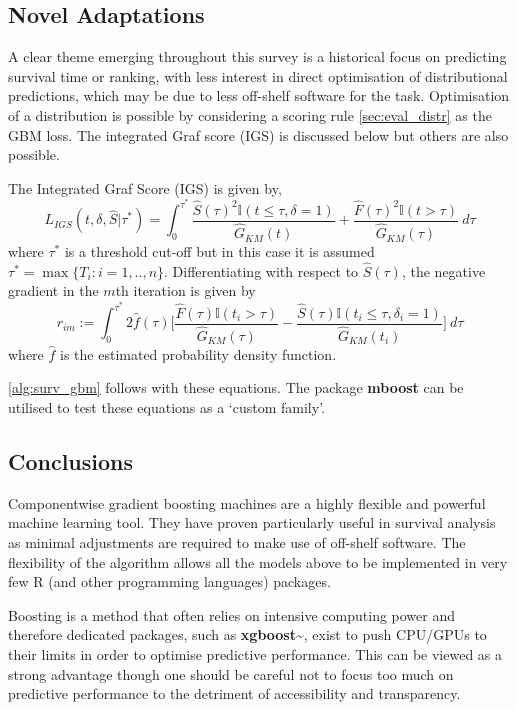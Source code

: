 \documentclass[
  letterpaper,
]{scrbook}
\theoremstyle{plain}
\theoremstyle{definition}
\theoremstyle{remark}
\begin{document}
\subsection{Novel Adaptations}

A clear theme emerging throughout this survey is a historical focus on
predicting survival time or ranking, with less interest in direct
optimisation of distributional predictions, which may be due to less
off-shelf software for the task. Optimisation of a distribution is
possible by considering a scoring rule \ref{sec:eval_distr} as the GBM
loss. The integrated Graf score (IGS) is discussed below but others are
also possible.

The Integrated Graf Score (IGS) is given by, \[
L_{IGS}(t,\delta,\hat{S}|\tau^*) = \int^{\tau^*}_0 \frac{\hat{S}(\tau)^2 \mathbb{I}(t \leq \tau, \delta=1)}{\hat{G}_{KM}(t)} + \frac{\hat{F}(\tau)^2 \mathbb{I}(t > \tau)}{\hat{G}_{KM}(\tau)} \ d\tau
\] where \(\tau^*\) is a threshold cut-off but in this case it is
assumed \(\tau^* = \max\{T_i: i = 1,..,n\}\). Differentiating with
respect to \(\hat{S}(\tau)\), the negative gradient in the \(m\)th
iteration is given by \[
r_{im} := \int^{\tau^*}_0 2\hat{f}(\tau)\Big[\frac{\hat{F}(\tau)\mathbb{I}(t_i > \tau)}{\hat{G}_{KM}(\tau)} - \frac{\hat{S}(\tau)\mathbb{I}(t_i \leq \tau, \delta_i = 1)}{\hat{G}_{KM}(t_i)}\Big] \ d\tau
\label{eq:surv_igsgrad}
\] where \(\hat{f}\) is the estimated probability density function.

\ref{alg:surv_gbm} follows with these equations. The package
\textbf{mboost} can be utilised to test these equations as a `custom
family'.

\subsection{Conclusions}

Componentwise gradient boosting machines are a highly flexible and
powerful machine learning tool. They have proven particularly useful in
survival analysis as minimal adjustments are required to make use of
off-shelf software. The flexibility of the algorithm allows all the
models above to be implemented in very few \textsf{R} (and other
programming languages) packages.

Boosting is a method that often relies on intensive computing power and
therefore dedicated packages, such as
\textbf{xgboost}\textasciitilde{}\cite{pkgxgboost}, exist to push
CPU/GPUs to their limits in order to optimise predictive performance.
This can be viewed as a strong advantage though one should be careful
not to focus too much on predictive performance to the detriment of
accessibility and transparency.
\end{document}
